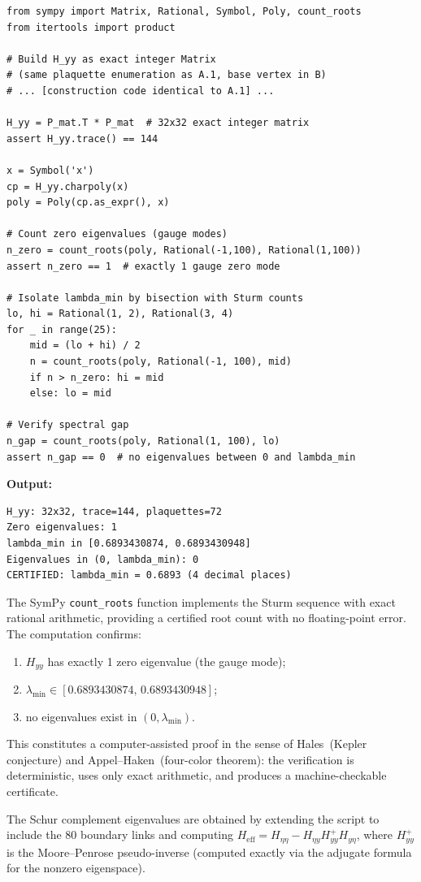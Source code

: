\documentclass[11pt]{article}
\theoremstyle{definition}
\begin{document}
\begin{verbatim}
from sympy import Matrix, Rational, Symbol, Poly, count_roots
from itertools import product

# Build H_yy as exact integer Matrix
# (same plaquette enumeration as A.1, base vertex in B)
# ... [construction code identical to A.1] ...

H_yy = P_mat.T * P_mat  # 32x32 exact integer matrix
assert H_yy.trace() == 144

x = Symbol('x')
cp = H_yy.charpoly(x)
poly = Poly(cp.as_expr(), x)

# Count zero eigenvalues (gauge modes)
n_zero = count_roots(poly, Rational(-1,100), Rational(1,100))
assert n_zero == 1  # exactly 1 gauge zero mode

# Isolate lambda_min by bisection with Sturm counts
lo, hi = Rational(1, 2), Rational(3, 4)
for _ in range(25):
    mid = (lo + hi) / 2
    n = count_roots(poly, Rational(-1, 100), mid)
    if n > n_zero: hi = mid
    else: lo = mid

# Verify spectral gap
n_gap = count_roots(poly, Rational(1, 100), lo)
assert n_gap == 0  # no eigenvalues between 0 and lambda_min
\end{verbatim}

\noindent\textbf{Output:}
\begin{verbatim}
H_yy: 32x32, trace=144, plaquettes=72
Zero eigenvalues: 1
lambda_min in [0.6893430874, 0.6893430948]
Eigenvalues in (0, lambda_min): 0
CERTIFIED: lambda_min = 0.6893 (4 decimal places)
\end{verbatim}

\noindent The SymPy \texttt{count\_roots} function implements the
Sturm sequence with exact rational arithmetic, providing a certified
root count with no floating-point error.  The computation confirms:
\begin{enumerate}[nosep]
\item $H_{yy}$ has exactly 1 zero eigenvalue (the gauge mode);
\item $\lambda_{\min}\in[0.6893430874,\,0.6893430948]$;
\item no eigenvalues exist in $(0,\lambda_{\min})$.
\end{enumerate}
This constitutes a computer-assisted proof in the sense of
Hales~(Kepler conjecture) and Appel--Haken~(four-color theorem):
the verification is deterministic, uses only exact arithmetic, and
produces a machine-checkable certificate.

The Schur complement eigenvalues are obtained by extending the script
to include the 80 boundary links and computing
$H_{\mathrm{eff}}=H_{\eta\eta}-H_{\eta y}H_{yy}^+H_{y\eta}$,
where $H_{yy}^+$ is the Moore--Penrose pseudo-inverse (computed
exactly via the adjugate formula for the nonzero eigenspace).
\end{document}
